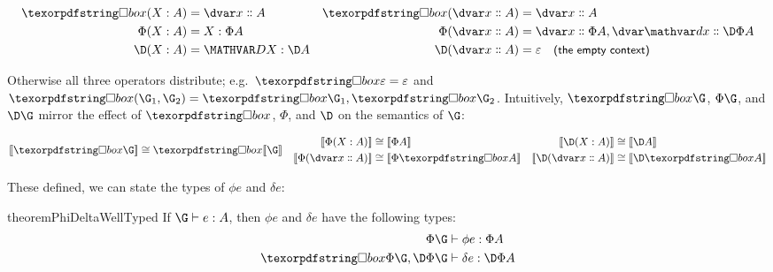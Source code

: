\begin{align*}
  \iso{(\hm x A)} &= \hd x A & \iso{(\hd x A)} &= \hd x A
  \\
  \Phi(\hm x A) &= \hm x {\Phi A} & \Phi(\hd x A) &= \hd x {\Phi A}, \hd \dx {\DP A}
  \\
  \D(\hm x A) &= \hm \dx {\D A}
  & \D(\hd x A) &= \emptycx\quad\textsf{\small(the empty context)}
\end{align*}

\noindent
Otherwise all three operators distribute; e.g.\ $\iso\emptycx = \emptycx$ and
$\iso(\G_1,\G_2) = \iso\G_1, \iso\G_2$.
%
Intuitively, $\iso\G$, $\Phi\G$, and $\D\G$ mirror the effect of
$\iso$, $\Phi$, and $\D$ on the semantics of $\G$:

\begin{align*}
  \den{\iso\G} &\cong \iso\den\G
  &
  \begin{aligned}
    \den{\Phi(\hm x A)} &\cong \den{\Phi A}
    \\
    \den{\Phi(\hd x A)} &\cong \den{\Phi \iso A}
  \end{aligned}
  &&
  \begin{aligned}
    \den{\D(\hm x A)} &\cong \den{\D A}
    \\
    \den{\D(\hd x A)} &\cong \den{\D \iso A}
  \end{aligned}
\end{align*}


\noindent
These defined, we can state the types of $\phi e$ and $\delta e$:

\begin{restatable}{theorem}{PhiDeltaWellTyped}
  \label{theorem-phi-delta-well-typed}
  If\/ $\J e \G A$, then $\phi e$ and $\delta e$ have the following types:
  \begin{align*}
    \Jalign {\phi e} {\Phi\G} {\Phi A}\\
    \Jalign {\delta e} {\iso{\Phi\G}, \DP\G} {\DP A}
  \end{align*}
\end{restatable}

